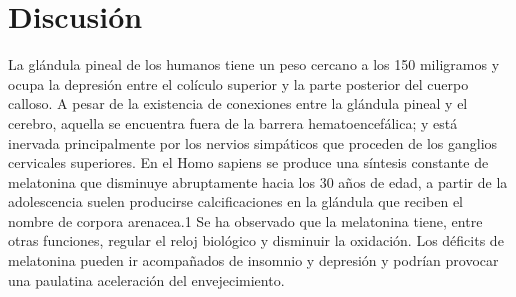 \documentclass[a4paper,twocolumn,10pt]{article}
\begin{document}
\section{Discusión}
La glándula pineal de los humanos tiene un peso cercano a los 150 miligramos y ocupa la depresión entre el colículo superior y la parte posterior del cuerpo calloso. A pesar de la existencia de conexiones entre la glándula pineal y el cerebro, aquella se encuentra fuera de la barrera hematoencefálica; y está inervada principalmente por los nervios simpáticos que proceden de los ganglios cervicales superiores.
En el Homo sapiens se produce una síntesis constante de melatonina que disminuye abruptamente hacia los 30 años de edad, a partir de la adolescencia suelen producirse calcificaciones en la glándula que reciben el nombre de corpora arenacea.1​ Se ha observado que la melatonina tiene, entre otras funciones, regular el reloj biológico y disminuir la oxidación. Los déficits de melatonina pueden ir acompañados de insomnio y depresión y podrían provocar una paulatina aceleración del envejecimiento.
\end{document}

